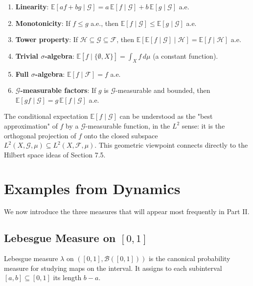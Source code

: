 \begin{enumerate}[nosep]
  \item \textbf{Linearity}: $\mathbb{E}[af + bg \mid \mathcal{G}] = a \, \mathbb{E}[f \mid \mathcal{G}] + b \, \mathbb{E}[g \mid \mathcal{G}]$ a.e.
  \item \textbf{Monotonicity}: If $f \leq g$ a.e., then $\mathbb{E}[f \mid \mathcal{G}] \leq \mathbb{E}[g \mid \mathcal{G}]$ a.e.
  \item \textbf{Tower property}: If $\mathcal{H} \subseteq \mathcal{G} \subseteq \mathcal{F}$, then $\mathbb{E}[\mathbb{E}[f \mid \mathcal{G}] \mid \mathcal{H}] = \mathbb{E}[f \mid \mathcal{H}]$ a.e.
  \item \textbf{Trivial $\sigma$-algebra}: $\mathbb{E}[f \mid \{\emptyset, X\}] = \int_X f \, d\mu$ (a constant function).
  \item \textbf{Full $\sigma$-algebra}: $\mathbb{E}[f \mid \mathcal{F}] = f$ a.e.
  \item \textbf{$\mathcal{G}$-measurable factors}: If $g$ is $\mathcal{G}$-measurable and bounded, then $\mathbb{E}[gf \mid \mathcal{G}] = g \, \mathbb{E}[f \mid \mathcal{G}]$ a.e.
\end{enumerate}

The conditional expectation $\mathbb{E}[f \mid \mathcal{G}]$ can be understood as the "best approximation" of $f$ by a $\mathcal{G}$-measurable function, in the $L^2$ sense: it is the orthogonal projection of $f$ onto the closed subspace $L^2(X, \mathcal{G}, \mu) \subseteq L^2(X, \mathcal{F}, \mu)$. This geometric viewpoint connects directly to the Hilbert space ideas of Section 7.5.


\bigskip


\section{Examples from Dynamics}\label{sec:7.8}

We now introduce the three measures that will appear most frequently in Part II.

\subsection{Lebesgue Measure on $[0,1]$}\label{sec:7.8.1}

Lebesgue measure $\lambda$ on $([0,1], \mathcal{B}([0,1]))$ is the canonical probability measure for studying maps on the interval. It assigns to each subinterval $[a,b] \subseteq [0,1]$ its length $b - a$.


